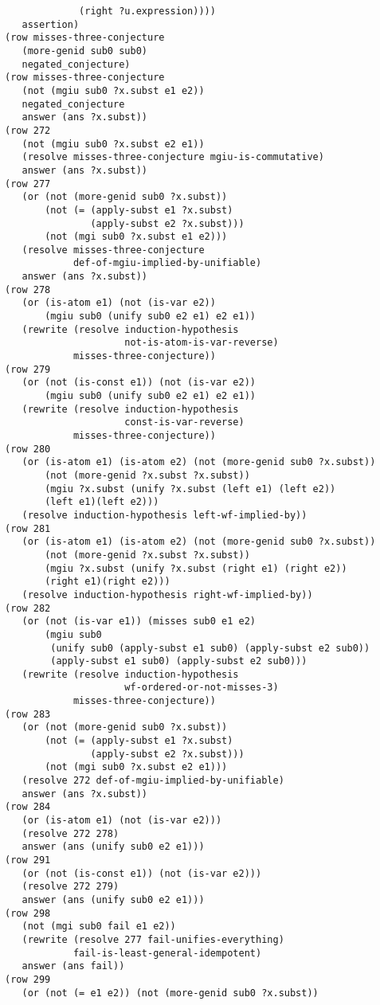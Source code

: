 \documentclass[runningheads]{llncs}
\begin{document}
\begin{verbatim}
             (right ?u.expression))))
   assertion)
(row misses-three-conjecture
   (more-genid sub0 sub0)
   negated_conjecture)
(row misses-three-conjecture
   (not (mgiu sub0 ?x.subst e1 e2))
   negated_conjecture
   answer (ans ?x.subst))
(row 272
   (not (mgiu sub0 ?x.subst e2 e1))
   (resolve misses-three-conjecture mgiu-is-commutative)
   answer (ans ?x.subst))
(row 277
   (or (not (more-genid sub0 ?x.subst))
       (not (= (apply-subst e1 ?x.subst) 
               (apply-subst e2 ?x.subst)))
       (not (mgi sub0 ?x.subst e1 e2)))
   (resolve misses-three-conjecture 
            def-of-mgiu-implied-by-unifiable)
   answer (ans ?x.subst))
(row 278
   (or (is-atom e1) (not (is-var e2))
       (mgiu sub0 (unify sub0 e2 e1) e2 e1))
   (rewrite (resolve induction-hypothesis 
                     not-is-atom-is-var-reverse) 
            misses-three-conjecture))
(row 279
   (or (not (is-const e1)) (not (is-var e2))
       (mgiu sub0 (unify sub0 e2 e1) e2 e1))
   (rewrite (resolve induction-hypothesis 
                     const-is-var-reverse) 
            misses-three-conjecture))
(row 280
   (or (is-atom e1) (is-atom e2) (not (more-genid sub0 ?x.subst))
       (not (more-genid ?x.subst ?x.subst))
       (mgiu ?x.subst (unify ?x.subst (left e1) (left e2)) 
       (left e1)(left e2)))
   (resolve induction-hypothesis left-wf-implied-by))
(row 281
   (or (is-atom e1) (is-atom e2) (not (more-genid sub0 ?x.subst))
       (not (more-genid ?x.subst ?x.subst))
       (mgiu ?x.subst (unify ?x.subst (right e1) (right e2)) 
       (right e1)(right e2)))
   (resolve induction-hypothesis right-wf-implied-by))
(row 282
   (or (not (is-var e1)) (misses sub0 e1 e2)
       (mgiu sub0
        (unify sub0 (apply-subst e1 sub0) (apply-subst e2 sub0))
        (apply-subst e1 sub0) (apply-subst e2 sub0)))
   (rewrite (resolve induction-hypothesis 
                     wf-ordered-or-not-misses-3) 
            misses-three-conjecture))
(row 283
   (or (not (more-genid sub0 ?x.subst))
       (not (= (apply-subst e1 ?x.subst) 
               (apply-subst e2 ?x.subst)))
       (not (mgi sub0 ?x.subst e2 e1)))
   (resolve 272 def-of-mgiu-implied-by-unifiable)
   answer (ans ?x.subst))
(row 284
   (or (is-atom e1) (not (is-var e2)))
   (resolve 272 278)
   answer (ans (unify sub0 e2 e1)))
(row 291
   (or (not (is-const e1)) (not (is-var e2)))
   (resolve 272 279)
   answer (ans (unify sub0 e2 e1)))
(row 298
   (not (mgi sub0 fail e1 e2))
   (rewrite (resolve 277 fail-unifies-everything) 
            fail-is-least-general-idempotent)
   answer (ans fail))
(row 299
   (or (not (= e1 e2)) (not (more-genid sub0 ?x.subst))

\end{verbatim}
\end{document}
